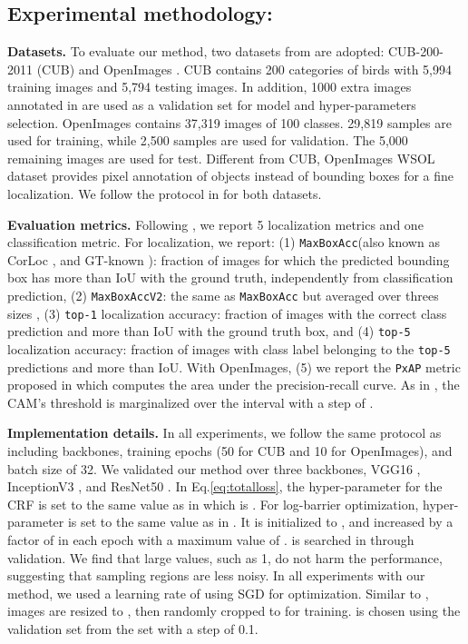 \documentclass[twocolumn]{article}
\newcommand\maxboxacc{\texttt{MaxBoxAcc}\xspace}
\newcommand\newmaxboxacc{\texttt{MaxBoxAccV2}\xspace}
\newcommand\pxap{\texttt{PxAP}\xspace}
\newcommand\topone{\texttt{top-1}\xspace}
\newcommand\topfive{\texttt{top-5}\xspace}
\theoremstyle{definition}
\begin{document}
\subsection{Experimental methodology:}
\label{subsec:expsettings}

\noindent \textbf{Datasets.} To evaluate our method, two datasets from \cite{choe2020evaluating} are adopted: CUB-200-2011 (CUB) \cite{WahCUB2002011} and OpenImages \cite{BenensonPF19,choe2020evaluating}. CUB contains 200 categories of birds with 5,994 training images and 5,794 testing images. In addition, 1000 extra images annotated in \cite{choe2020evaluating} are used as a validation set for model and hyper-parameters selection. OpenImages contains 37,319 images of 100 classes. 29,819 samples are used for training, while 2,500 samples are used for validation. The 5,000 remaining images are used for test. Different from CUB, OpenImages WSOL dataset provides pixel annotation of objects instead of bounding boxes for a fine localization. We follow the protocol in \cite{choe2020evaluating} for both datasets.

\noindent \textbf{Evaluation metrics.} Following \cite{choe2020evaluating}, we report 5 localization metrics and one classification metric. For localization, we report: (1) \maxboxacc (also known as CorLoc \cite{deselaers2012weakly}, and GT-known \cite{SinghL17}): fraction of images for which the predicted bounding box has more than  IoU with the ground truth,  independently from classification prediction, (2) \newmaxboxacc: the same as \maxboxacc but averaged over threes sizes , (3) \topone localization accuracy: fraction of images with the correct class prediction and more than  IoU with the ground truth box, and (4) \topfive localization accuracy: fraction of images with class label belonging to the \topfive predictions and more than  IoU.  With OpenImages, (5) we report the \pxap metric proposed in \cite{choe2020evaluating} which computes the area under the precision-recall curve. As in \cite{choe2020evaluating}, the CAM's threshold is marginalized over the interval  with a step of .

\noindent \textbf{Implementation details.} In all experiments, we follow the same protocol as  \cite{choe2020evaluating} including backbones, training epochs (50 for CUB and 10 for OpenImages), and batch size of 32. We validated our method over three backbones, VGG16 \cite{SimonyanZ14a}, InceptionV3 \cite{SzegedyVISW16}, and ResNet50 \cite{heZRS16}. In Eq.\ref{eq:totalloss}, the hyper-parameter  for the CRF is set to the same value as in \cite{tang2018regularized} which is . For log-barrier optimization, hyper-parameter  is set to the same value as in \cite{belharbi2019unimoconstraints,kervadec2019log}. It is initialized to , and increased by a factor of  in each epoch with a maximum value of .  is searched in  through validation. We find that large values, such as 1, do not harm the performance, suggesting that sampling regions are less noisy. In all experiments with our method, we used a learning rate of  using SGD for optimization. Similar to \cite{choe2020evaluating}, images are resized to , then randomly cropped to  for training.  is chosen using the validation set from the set  with a step of 0.1.
\end{document}
